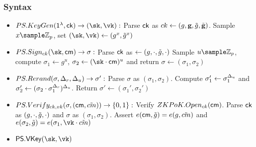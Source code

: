 \subsubsection{Syntax}
\begin{itemize}
    \item $PS.KeyGen(\secparam, \ck) \to (\sk, \vk):$ Parse $\mathsf{ck}$ as $ck \gets (g, \textbf{g}, \tilde{g}, \tilde{\textbf{g}})$. Sample $x \sample \Zp$, set $(\sk, \vk) \gets (g^x, \tilg^x)$

    \item $PS.Sign_{ck}(\sk, \cm) \to \sigma:$ Parse $\mathsf{ck}$ as $\gets (g, \cdot, \tilde{g}, \cdot)$ Sample $u \sample \Zp$, compute $\sigma_1 \gets g^u$, $\sigma_2 \gets (\sk \cdot \cm)^u$
     and return $\sigma \gets (\sigma_1, \sigma_2)$

     \item $PS.Rerand(\sigma, \Delta_r, \Delta_u) \to \sigma': $ Parse $\sigma$ as $(\sigma_1, \sigma_2)$. Compute $\sigma_1' \gets \sigma_1^{\Delta_u}$ and $\sigma_2' \gets (\sigma_2 \cdot \sigma_1^{\Delta_r})^{\Delta_u}$. Return $\sigma' \gets (\sigma_1', \sigma_2')$

     \item $PS.Verify_{ck, vk}(\sigma, (\mathsf{cm}, \tilde{cm})) \to \{0,1\}: $ Verify $ZKPoK.Open_{ck}(\mathsf{cm})$. Parse $\mathsf{ck}$ as $(g, \cdot, \tilde{g}, \cdot)$ and $\sigma$ as $(\sigma_1, \sigma_2)$. Assert $e(\mathsf{cm}, \tilde{g}) = e(g, \tilde{cm})$ and $e(\sigma_2, \tilg) = e(\sigma_1, \vk \cdot \tilcm)$

     \item $\mathsf{PS.VKey}(\sk, \vk)$ 
     
\end{itemize}
